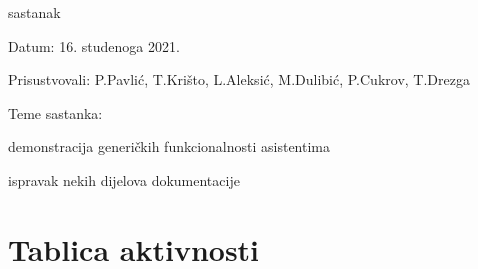 \begin{packed_enum}
			\item  sastanak
			\item[] \begin{packed_item}
				\item Datum: 16. studenoga 2021.
				\item Prisustvovali: P.Pavlić, T.Krišto, L.Aleksić, M.Dulibić, P.Cukrov, T.Drezga
				\item Teme sastanka:
				\begin{packed_item}
					\item demonstracija generičkih funkcionalnosti asistentima
					\item ispravak nekih dijelova dokumentacije
				\end{packed_item}
			\end{packed_item}
						
		\end{packed_enum}
		
		\eject
		\section*{Tablica aktivnosti}
		
%			

